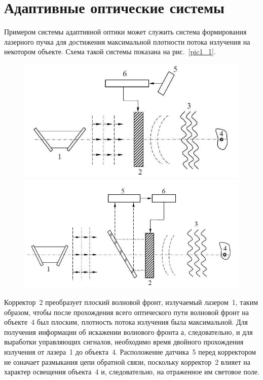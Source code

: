 \documentclass[pscyr]{hedwork}
\newcommand{\pic}[1]{\ref{pic#1}}
\begin{document}
\maketitle
\onehalfspacing

\section{Адаптивные оптические системы}

Примером системы адаптивной оптики может служить система формирования лазерного
пучка для достижения максимальной плотности потока излучения на некотором
объекте. Схема такой системы показана на рис.~\pic{1_1}.

\begin{figure}[ht]
  \center
  \includegraphics[width=.47\textwidth]{sl_1_1} \hfill
  \includegraphics[width=.47\textwidth]{sl_1_2} \\
  \parbox{.47\textwidth}{ \caption{} \label{pic1_1} } \hfill
  \parbox{.47\textwidth}{ \caption{} \label{pic1_2} }
\end{figure}

Корректор~2 преобразует плоский волновой фронт, излучаемый лазером~1, таким
образом, чтобы после прохождения всего оптического пути волновой фронт на
объекте~4 был плоским, плотность потока излучения была максимальной. Для
получения информации об искажении волнового фронта а, следовательно, и для
выработки управляющих сигналов, необходимо время двойного прохождения излучения
от лазера~1 до объекта~4. Расположение датчика~5 перед корректором не означает
размыкания цепи обратной связи, поскольку корректор~2 влияет на характер
освещения объекта~4 и, следовательно, на отраженное им световое поле.
\end{document}

